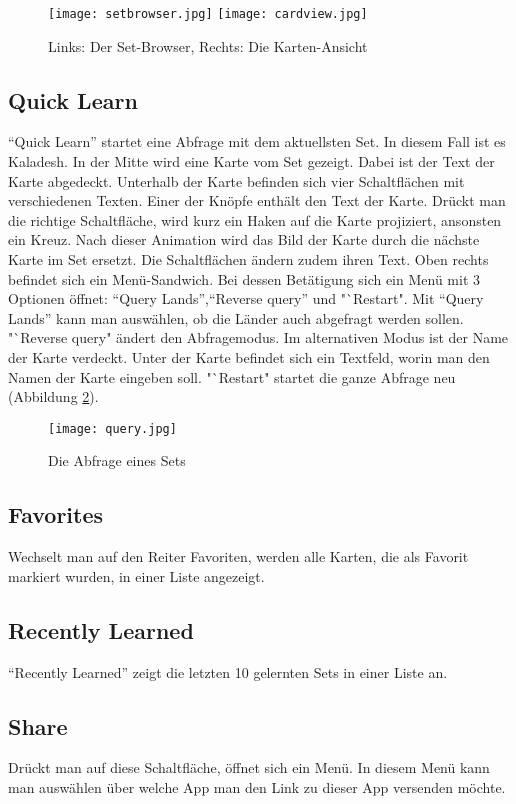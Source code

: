 \begin{figure}[htbp]
 \centering
    \texttt{[image: setbrowser.jpg]}
     \texttt{[image: cardview.jpg]}
 \caption{Links: Der Set-Browser, Rechts: Die Karten-Ansicht \cite{Magiccard}}
 \label{fig:setbrowser}
\end{figure}

\subsection{Quick Learn}
"`Quick Learn"' startet eine Abfrage mit dem aktuellsten Set. In diesem Fall ist es Kaladesh. In der Mitte wird eine Karte vom Set gezeigt. Dabei ist der Text der Karte abgedeckt. Unterhalb der Karte befinden sich vier Schaltflächen mit verschiedenen Texten. Einer der Knöpfe enthält den Text der Karte. Drückt man die richtige Schaltfläche, wird kurz ein Haken auf die Karte projiziert, ansonsten ein Kreuz. Nach dieser Animation wird das Bild der Karte durch die nächste Karte im Set ersetzt. Die Schaltflächen ändern zudem ihren Text. Oben rechts befindet sich ein Menü-Sandwich. Bei dessen Betätigung sich ein Menü mit 3 Optionen öffnet: "`Query Lands"',"`Reverse query"' und "`Restart". Mit "`Query Lands"' kann man auswählen, ob die Länder auch abgefragt werden sollen. "`Reverse query" ändert den Abfragemodus. Im alternativen Modus ist der Name der Karte verdeckt. Unter der Karte befindet sich ein Textfeld, worin man den Namen der Karte eingeben soll. "`Restart" startet die ganze Abfrage neu (Abbildung \ref{fig:queryview}).

\begin{figure}[htbp]
 \centering
    \texttt{[image: query.jpg]}
 \caption{Die Abfrage eines Sets \cite{Magiccard}}
 \label{fig:queryview}
\end{figure}

\subsection{Favorites}
Wechselt man auf den Reiter Favoriten, werden alle Karten, die als Favorit markiert wurden, in einer Liste angezeigt.

\subsection{Recently Learned}
"`Recently Learned"' zeigt die letzten 10 gelernten Sets in einer Liste an.

\subsection{Share}
Drückt man auf diese Schaltfläche, öffnet sich ein Menü. In diesem Menü kann man auswählen über welche App man den Link zu dieser App versenden möchte.

